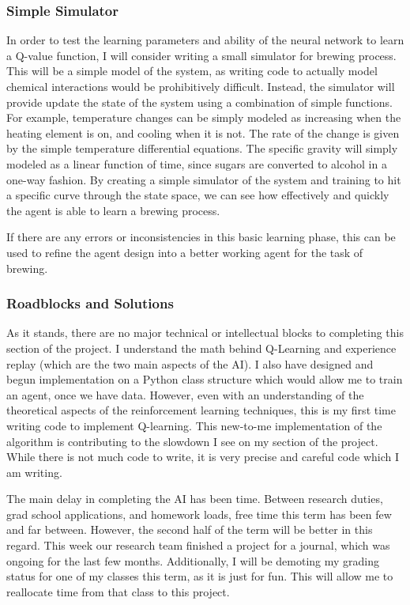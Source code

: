 \documentclass[draftclsnofoot,onecolumn,letterpaper,10pt]{IEEEtran}
\begin{document}
\subsubsection{Simple Simulator}
In order to test the learning parameters and ability of the neural network to learn a Q-value function, I will consider writing a small simulator for brewing process.
This will be a simple model of the system, as writing code to actually model chemical interactions would be prohibitively difficult.
Instead, the simulator will provide update the state of the system using a combination of simple functions.
For example, temperature changes can be simply modeled as increasing when the heating element is on, and cooling when it is not.
The rate of the change is given by the simple temperature differential equations.
The specific gravity will simply modeled as a linear function of time, since sugars are converted to alcohol in a one-way fashion.
By creating a simple simulator of the system and training to hit a specific curve through the state space, we can see how effectively and quickly the agent is able to learn a brewing process.

If there are any errors or inconsistencies in this basic learning phase, this can be used to refine the agent design into a better working agent for the task of brewing.

\subsubsection{Roadblocks and Solutions}
As it stands, there are no major technical or intellectual blocks to completing this section of the project.
I understand the math behind Q-Learning and experience replay (which are the two main aspects of the AI).
I also have designed and begun implementation on a Python class structure which would allow me to train an agent, once we have data.
However, even with an understanding of the theoretical aspects of the reinforcement learning techniques, this is my first time writing code to implement Q-learning.
This new-to-me implementation of the algorithm is contributing to the slowdown I see on my section of the project.
While there is not much code to write, it is very precise and careful code which I am writing.

The main delay in completing the AI has been time.
Between research duties, grad school applications, and homework loads, free time this term has been few and far between.
However, the second half of the term will be better in this regard. This week our research team finished a project for a journal, which was ongoing for the last few months.
Additionally, I will be demoting my grading status for one of my classes this term, as it is just for fun.
This will allow me to reallocate time from that class to this project.
\end{document}
